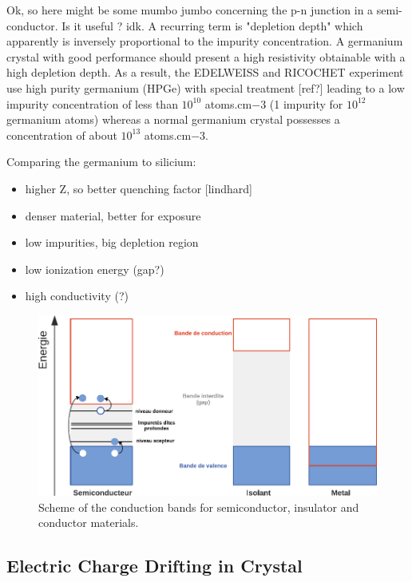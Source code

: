Ok, so here might be some mumbo jumbo concerning the p-n junction in a semi-conductor. Is it useful ? idk.
A recurring term is "depletion depth" which apparently is inversely proportional to the impurity concentration.
A germanium crystal with good performance should present a high resistivity obtainable with a high depletion depth.
As a result, the EDELWEISS and RICOCHET experiment use high purity germanium (HPGe) with special treatment [ref?] leading to a low impurity concentration of less than $10^{10}$ atoms.cm${-3}$ (1 impurity for $10^{12}$ germanium atoms) whereas a normal germanium crystal possesses a concentration of about $10^{13}$ atoms.cm${-3}$.

Comparing the germanium to silicium:
\begin{itemize}
	\item higher Z, so better quenching factor [lindhard]
	\item denser material, better for exposure
	\item low impurities, big depletion region
	\item low ionization energy (gap?)
	\item high conductivity (?)
\end{itemize}

\begin{figure}
\centering
\includegraphics[width=\linewidth]{Figures/Electrodes/conduction_bands.pdf}
\caption{Scheme of the conduction bands for semiconductor, insulator and conductor materials.}
\label{fig:conduction-bands}
\end{figure}


\subsection{Electric Charge Drifting in Crystal}
\label{par:charge-drifting}

